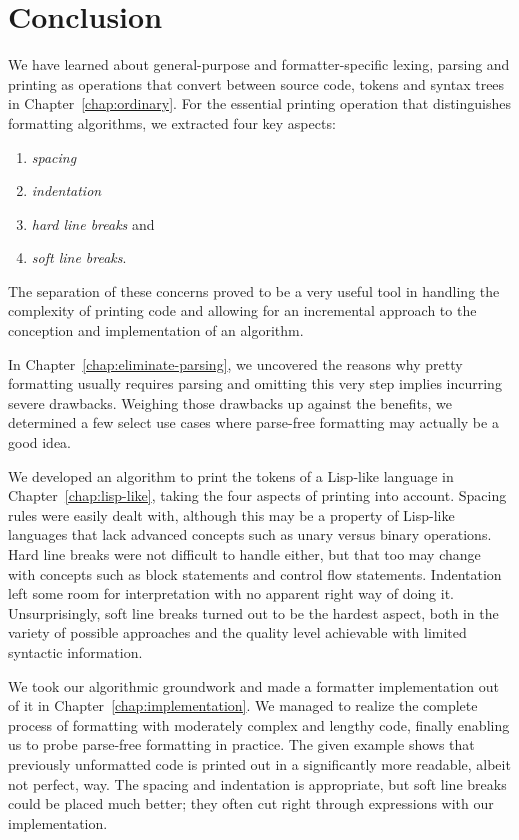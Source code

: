 \chapter{Conclusion}
We have learned about general-purpose and formatter-specific
lexing, parsing and printing as operations that convert between
source code, tokens and syntax trees in Chapter~\ref{chap:ordinary}.
For the essential printing operation that distinguishes formatting algorithms,
we extracted four key aspects:
\begin{enumerate}
  \item{\textit{spacing}}
  \item{\textit{indentation}}
  \item{\textit{hard line breaks}} and
  \item{\textit{soft line breaks}}.
\end{enumerate}
The separation of these concerns proved to be a very useful tool in
handling the complexity of printing code and
allowing for an incremental approach to
the conception and implementation of an algorithm.

In Chapter~\ref{chap:eliminate-parsing},
we uncovered the reasons why
pretty formatting usually requires parsing and
omitting this very step implies incurring severe drawbacks.
Weighing those drawbacks up against the benefits,
we determined a few select use cases where
parse-free formatting may actually be a good idea.

We developed an algorithm to print the
tokens of a Lisp-like language in Chapter~\ref{chap:lisp-like},
taking the four aspects of printing into account.
Spacing rules were easily dealt with,
although this may be a property of Lisp-like languages
that lack advanced concepts such as
unary versus binary operations.
Hard line breaks were not difficult to handle either,
but that too may change with concepts
such as block statements and control flow statements.
Indentation left some room for interpretation
with no apparent right way of doing it.
Unsurprisingly, soft line breaks turned out to be the hardest aspect,
both in the variety of possible approaches
and the quality level achievable with limited syntactic information.

We took our algorithmic groundwork and
made a formatter implementation out of it in Chapter~\ref{chap:implementation}.
We managed to realize the complete process of formatting
with moderately complex and lengthy code,
finally enabling us to probe parse-free formatting in practice.
The given example shows that previously unformatted code
is printed out in a significantly more readable,
albeit not perfect, way.
The spacing and indentation is appropriate,
but soft line breaks could be placed much better;
they often cut right through expressions with our implementation.

